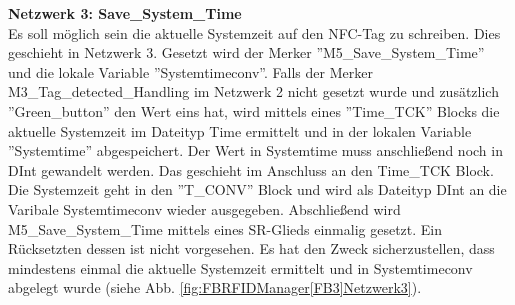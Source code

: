 \textbf{Netzwerk 3: Save\_System\_Time}\\Es soll möglich sein die aktuelle Systemzeit auf den NFC-Tag zu schreiben. Dies geschieht in Netzwerk 3. Gesetzt wird der Merker ''M5\_Save\_System\_Time'' und die lokale Variable ''Systemtimeconv''. Falls der Merker M3\_Tag\_detected\_Handling im Netzwerk 2 nicht gesetzt wurde und zusätzlich ''Green\_button'' den Wert eins hat, wird mittels eines ''Time\_TCK'' Blocks die aktuelle Systemzeit im Dateityp Time ermittelt und in der lokalen Variable ''Systemtime'' abgespeichert. Der Wert in Systemtime muss anschließend noch in DInt gewandelt werden. Das geschieht im Anschluss an den Time\_TCK Block. Die Systemzeit geht in den ''T\_CONV'' Block und wird als Dateityp DInt an die Varibale Systemtimeconv wieder ausgegeben. Abschließend wird M5\_Save\_System\_Time mittels eines SR-Glieds einmalig gesetzt. Ein Rücksetzten dessen ist nicht vorgesehen. Es hat den Zweck sicherzustellen, dass mindestens einmal die aktuelle Systemzeit ermittelt und in Systemtimeconv abgelegt wurde (siehe Abb. \ref{fig:FBRFIDManager[FB3]Netzwerk3}).

